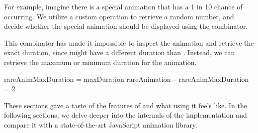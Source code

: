 For example, imagine there is a special animation that has a 1 in 10 chance of occurring. We utilize a custom  operation to retrieve a random number, and decide whether the special animation should be displayed using the  combinator.


This combinator has made it impossible to inspect the animation and retrieve the exact duration, since  might have a different duration than . Instead, we can retrieve the maximum or minimum duration for the animation.

\begin{spec}
rareAnimMaxDuration = maxDuration rareAnimation
-- rareAnimMaxDuration = 2
\end{spec}

These sections gave a taste of the features of \dsl{} and what using it feels like. In the following sections, we delve deeper into the internals of the implementation and compare it with a state-of-the-art JavaScript animation library.
